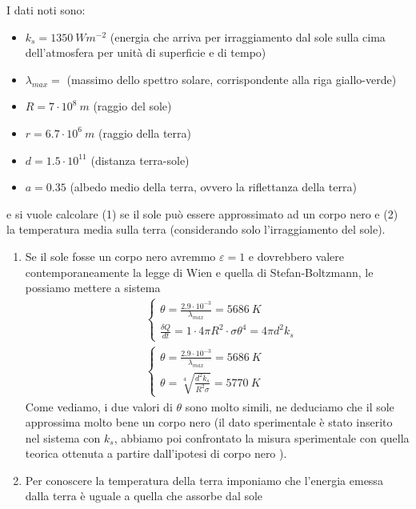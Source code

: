 \documentclass[
10pt, %
a4paper, %
oneside, %
headinclude,footinclude, %
BCOR5mm, %
]{scrartcl}
\begin{document}
\begin{exercise}
	I dati noti sono:
	\begin{itemize}
		\item $k_s = 1350\ W m^{-2}$  (energia che arriva per irraggiamento dal sole sulla cima dell'atmosfera per unità di superficie e di tempo)
		\item $\lambda_{max} = $      (massimo dello spettro solare, corrispondente alla riga giallo-verde)
		\item $R = 7\cdot 10^8\ m$ (raggio del sole)
		\item $r = 6.7\cdot 10^6\ m$ (raggio della terra)
		\item $d = 1.5 \cdot 10^{11}$ (distanza terra-sole)
		\item $a = 0.35 $ (albedo medio della terra, ovvero la riflettanza della terra)
	\end{itemize}
	e si vuole calcolare (1) se il sole può essere approssimato ad un corpo nero e (2) la temperatura media sulla terra (considerando solo l'irraggiamento del sole).\\
	\begin{enumerate}
		\item  Se il sole fosse un corpo nero avremmo $\varepsilon = 1$ e dovrebbero valere contemporaneamente la legge di Wien e quella di Stefan-Boltzmann, le possiamo mettere a sistema
		\begin{align*}
			&\begin{cases}
				\theta = \frac{2.9 \cdot 10^{-3}}{\lambda_{max}} = 5686\ K\\
				\frac{\delta Q}{dt} = 1 \cdot 4\pi R^2\cdot \sigma \theta^4 = 4\pi d^2 k_s
			\end{cases}\\
			&\begin{cases}
				\theta = \frac{2.9 \cdot 10^{-3}}{\lambda_{max}} = 5686\ K\\
				\theta = \sqrt[4]{\frac{d^2 k_s}{R^2 \sigma}} = 5770\ K
			\end{cases}
		\end{align*}
		Come vediamo, i due valori di $\theta$ sono molto simili, ne deduciamo che il sole approssima molto bene un corpo nero (il dato sperimentale è stato inserito nel sistema con \(k_s\), abbiamo poi confrontato la misura sperimentale con quella teorica ottenuta a partire dall'ipotesi di corpo nero ). 
		\item Per conoscere la temperatura della terra imponiamo che l'energia emessa dalla terra è uguale a quella che assorbe dal sole

\end{enumerate}
\end{exercise}
\end{document}
